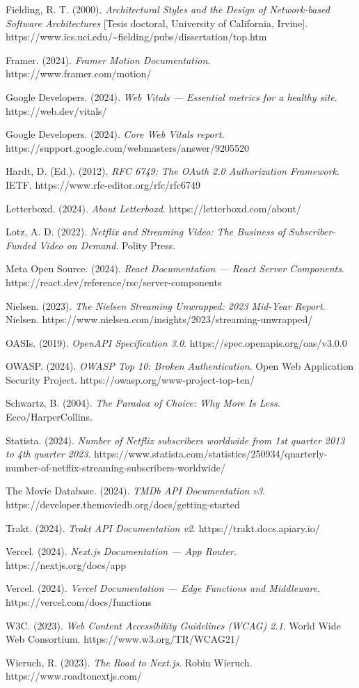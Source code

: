 \documentclass[
]{article}
\begin{document}
Fielding, R. T. (2000). \emph{Architectural Styles and the Design of
Network-based Software Architectures} {[}Tesis doctoral, University of
California, Irvine{]}.
https://www.ics.uci.edu/\textasciitilde fielding/pubs/dissertation/top.htm

Framer. (2024). \emph{Framer Motion Documentation}.
https://www.framer.com/motion/

Google Developers. (2024). \emph{Web Vitals --- Essential metrics for a
healthy site}. https://web.dev/vitals/

Google Developers. (2024). \emph{Core Web Vitals report}.
https://support.google.com/webmasters/answer/9205520

Hardt, D. (Ed.). (2012). \emph{RFC 6749: The OAuth 2.0 Authorization
Framework}. IETF. https://www.rfc-editor.org/rfc/rfc6749

Letterboxd. (2024). \emph{About Letterboxd}.
https://letterboxd.com/about/

Lotz, A. D. (2022). \emph{Netflix and Streaming Video: The Business of
Subscriber-Funded Video on Demand}. Polity Press.

Meta Open Source. (2024). \emph{React Documentation --- React Server
Components}. https://react.dev/reference/rsc/server-components

Nielsen. (2023). \emph{The Nielsen Streaming Unwrapped: 2023 Mid-Year
Report}. Nielsen.
https://www.nielsen.com/insights/2023/streaming-unwrapped/

OASIs. (2019). \emph{OpenAPI Specification 3.0}.
https://spec.openapis.org/oas/v3.0.0

OWASP. (2024). \emph{OWASP Top 10: Broken Authentication}. Open Web
Application Security Project. https://owasp.org/www-project-top-ten/

Schwartz, B. (2004). \emph{The Paradox of Choice: Why More Is Less}.
Ecco/HarperCollins.

Statista. (2024). \emph{Number of Netflix subscribers worldwide from 1st
quarter 2013 to 4th quarter 2023}.
https://www.statista.com/statistics/250934/quarterly-number-of-netflix-streaming-subscribers-worldwide/

The Movie Database. (2024). \emph{TMDb API Documentation v3}.
https://developer.themoviedb.org/docs/getting-started

Trakt. (2024). \emph{Trakt API Documentation v2}.
https://trakt.docs.apiary.io/

Vercel. (2024). \emph{Next.js Documentation --- App Router}.
https://nextjs.org/docs/app

Vercel. (2024). \emph{Vercel Documentation --- Edge Functions and
Middleware}. https://vercel.com/docs/functions

W3C. (2023). \emph{Web Content Accessibility Guidelines (WCAG) 2.1}.
World Wide Web Consortium. https://www.w3.org/TR/WCAG21/

Wieruch, R. (2023). \emph{The Road to Next.js}. Robin Wieruch.
https://www.roadtonextjs.com/
\end{document}
